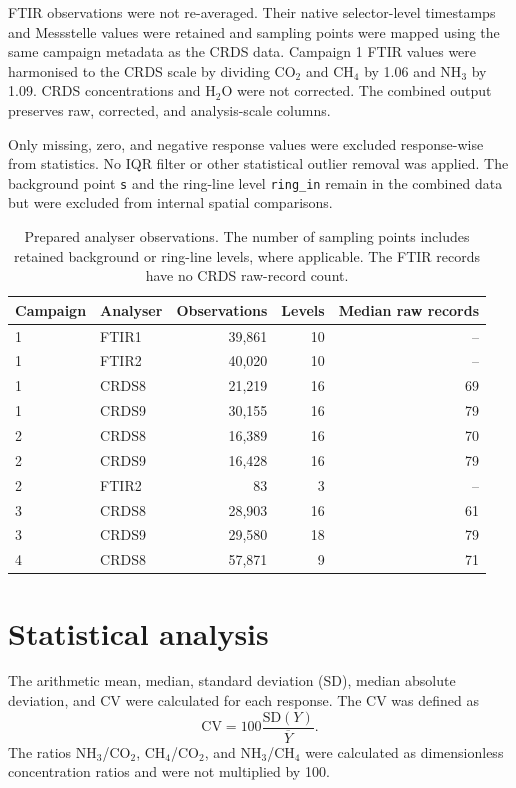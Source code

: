 \documentclass[11pt,a4paper]{article}
\begin{document}
FTIR observations were not re-averaged. Their native selector-level timestamps and Messstelle values were retained and sampling points were mapped using the same campaign metadata as the CRDS data. Campaign 1 FTIR values were harmonised to the CRDS scale by dividing CO$_2$ and CH$_4$ by 1.06 and NH$_3$ by 1.09. CRDS concentrations and H$_2$O were not corrected. The combined output preserves raw, corrected, and analysis-scale columns.

Only missing, zero, and negative response values were excluded response-wise from statistics. No IQR filter or other statistical outlier removal was applied. The background point \texttt{s} and the ring-line level \texttt{ring\_in} remain in the combined data but were excluded from internal spatial comparisons.

\begin{table}[H]
\centering
\caption{Prepared analyser observations. The number of sampling points includes retained background or ring-line levels, where applicable. The FTIR records have no CRDS raw-record count.}
\small
\begin{tabular}{llrrr}
\toprule
Campaign & Analyser & Observations & Levels & Median raw records\\
\midrule
1 & FTIR1 & 39,861 & 10 & --\\
1 & FTIR2 & 40,020 & 10 & --\\
1 & CRDS8 & 21,219 & 16 & 69\\
1 & CRDS9 & 30,155 & 16 & 79\\
2 & CRDS8 & 16,389 & 16 & 70\\
2 & CRDS9 & 16,428 & 16 & 79\\
2 & FTIR2 & 83 & 3 & --\\
3 & CRDS8 & 28,903 & 16 & 61\\
3 & CRDS9 & 29,580 & 18 & 79\\
4 & CRDS8 & 57,871 & 9 & 71\\
\bottomrule
\end{tabular}
\end{table}

\section{Statistical analysis}

The arithmetic mean, median, standard deviation (SD), median absolute deviation, and CV were calculated for each response. The CV was defined as
\[
\mathrm{CV}=100\frac{\mathrm{SD}(Y)}{\overline{Y}}.
\]
The ratios NH$_3$/CO$_2$, CH$_4$/CO$_2$, and NH$_3$/CH$_4$ were calculated as dimensionless concentration ratios and were not multiplied by 100.
\end{document}
